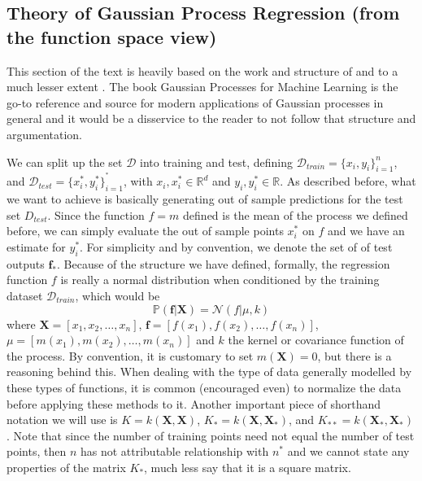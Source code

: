 \subsection{Theory of Gaussian Process Regression (from the function space view)}

This section of the text is heavily based on the work and structure of \cite{rasmussen2006gaussian} and to a much lesser extent \cite{wang2020intuitive}. The book Gaussian Processes for Machine Learning is the go-to reference and source for modern applications of Gaussian processes in general and it would be a disservice to the reader to not follow that structure and argumentation. 

We can split up the set $\mathcal{D}$ into training and test, defining $\mathcal{D}_{train} = \{ x_i , y_i \}_{i=1}^n$, and $\mathcal{D}_{test} = \{ x^*_i , y^*_i \}_{i=1}^{^*}$, with $x_i, x^*_i \in \mathbb{R}^d$ and $y_i, y^*_i \in \mathbb{R}$. As described before, what we want to achieve is basically generating out of sample predictions for the test set $D_{test}$. Since the function $f = m$ defined is the mean of the process we defined before, we can simply evaluate the out of sample points $x_i^*$ on $f$ and we have an estimate for $y_i^*$. For simplicity and by convention, we denote the set of of test outputs $\boldsymbol{f}_*$. Because of the structure we have defined, formally, the regression function $f$ is really a normal distribution when conditioned by the training dataset $\mathcal{D}_{train}$, which would be
\[ \mathbb{P}(\boldsymbol{f} | \boldsymbol{X}) = \mathcal{N}(f | \mu, k) \]
where $\boldsymbol{X} = [ x_1, x_2, \ldots , x_n ]$, $\boldsymbol{f} = [ f(x_1), f(x_2), \ldots, f(x_n) ]$, $\mu= [ m(x_1), m(x_2), \ldots, m(x_n) ]$ and $k$ the kernel or covariance function of the process. By convention, it is customary to set $m(\boldsymbol{X}) = 0$, but there is a reasoning behind this. When dealing with the type of data generally modelled by these types of functions, it is common (encouraged even) to normalize the data before applying these methods to it. Another important piece of shorthand notation we will use is $K=k(\boldsymbol{X}, \boldsymbol{X})$, $K_*=k(\boldsymbol{X}, \boldsymbol{X}_*)$, and $K_{**}=k(\boldsymbol{X}_*, \boldsymbol{X}_*)$. Note that since the number of training points need not equal the number of test points, then $n$ has not attributable relationship with $n^*$ and we cannot state any properties of the matrix $K_*$, much less say that it is a square matrix. 

